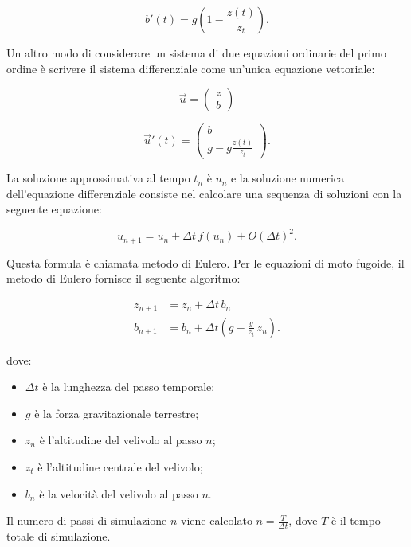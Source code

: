 \begin{equation}
b'(t) = g\left(1-\frac{z(t)}{z_t}\right).
\end{equation}

\noindent
Un altro modo di considerare un sistema di due equazioni ordinarie del primo ordine è scrivere il sistema differenziale come un’unica equazione vettoriale:

\begin{equation}
\vec{u}  = \begin{pmatrix} z \\ b \end{pmatrix}
\end{equation}

\begin{equation}
\vec{u}'(t)  = \begin{pmatrix} b\\ g-g\frac{z(t)}{z_t} \end{pmatrix}.
\end{equation}

\noindent
La soluzione approssimativa al tempo $t_n$ è $u_n$ e la soluzione numerica dell’equazione differenziale consiste nel calcolare una sequenza di soluzioni con la seguente equazione:

\begin{equation}
u_{n+1} = u_n + \Delta t \,f(u_n) + O(\Delta t)^2.
\end{equation}

\noindent
Questa formula è chiamata metodo di Eulero. Per le equazioni di moto fugoide, il metodo di Eulero fornisce il seguente algoritmo:

\begin{align}
z_{n+1} & = z_n + \Delta t \, b_n \\
b_{n+1} & = b_n + \Delta t \left(g - \frac{g}{z_t} \, z_n \right).
\end{align}

\noindent
dove:
\begin{itemize}
\item $\Delta t$ è la lunghezza del passo temporale;
\item $g$ è la forza gravitazionale terrestre;
\item $z_n$ è l'altitudine del velivolo al passo $n$;
\item $z_t$ è l'altitudine centrale del velivolo;
\item $b_n$ è la velocità del velivolo al passo $n$.
\end{itemize}

\noindent
Il numero di passi di simulazione $n$ viene calcolato $n = \frac{T}{\Delta t}$, dove $T$ è il
tempo totale di simulazione.

